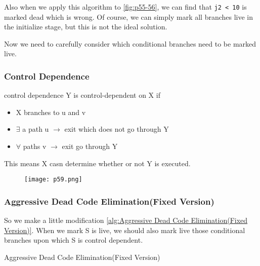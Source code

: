 Also when we apply this algorithm to \ref{fig:p55-56}, we can find that \texttt{j2 < 10} is marked dead which is wrong. Of course,
we can simply mark all branches live in the initialize stage, but this is not the ideal solution.


Now we need to carefully consider which conditional branches need to be marked live.



\subsubsection{Control Dependence}

\begin{definition}{control dependence}
	Y is control-dependent on X if
	\begin{itemize}
		\item X branches to u and v
		\item $\exists$ a path u $\rightarrow$ exit which does not go through Y
		\item $\forall$ paths v  $\rightarrow$ exit go through Y
	\end{itemize}
	This means X casn determine whether or not Y is executed.
	\begin{figure}[H]
		\centering
		\texttt{[image: p59.png]}

	\end{figure}
\end{definition}


\subsubsection{Aggressive Dead Code Elimination(Fixed Version)}

So we make a little modification \ref{alg:Aggressive Dead Code Elimination(Fixed Version)}. When we mark S is live, we should also mark live those conditional branches upon which S is
control dependent.

\begin{algorithm}[H]
	\caption{Aggressive Dead Code Elimination(Fixed Version)}\label{alg:Aggressive Dead Code Elimination(Fixed Version)}
	\begin{algorithmic}
		\EndIf
		\EndWhile
		\EndFunction
	\end{algorithmic}
\end{algorithm}




